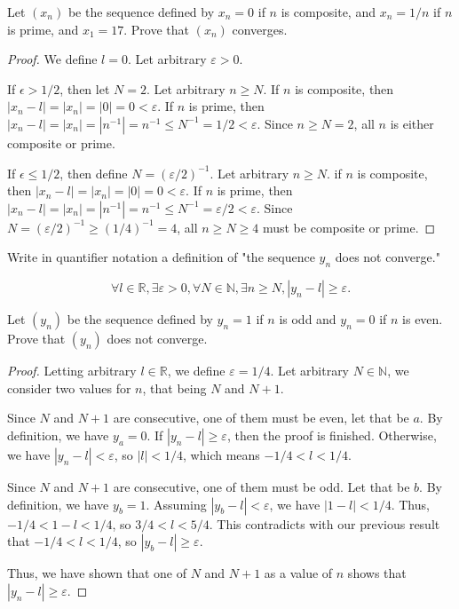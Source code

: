 \documentclass[11pt]{article}
\begin{document}
\begin{subquestion}
    Let $(x_n)$ be the sequence defined by $x_n = 0$ if $n$ is composite,
    and $x_n = 1/n$ if $n$ is prime, and $x_1 = 17$.
    Prove that $(x_n)$ converges.
\end{subquestion}
\begin{proof}
    We define $l = 0$. Let arbitrary $\varepsilon > 0$.

    If $\epsilon > 1/2$, then let $N = 2$.
    Let arbitrary $n \ge N$.
    If $n$ is composite, then $|x_n - l| = |x_n| = |0| = 0 < \varepsilon$.
    If $n$ is prime, then $|x_n - l| = |x_n| = |n^{-1}| = n^{-1} \le N^{-1} = 1/2 < \varepsilon$.
    Since $n \ge N = 2$, all $n$ is either composite or prime.
    
    If $\epsilon \le 1/2$, then define $N=(\varepsilon/2)^{-1}$.
    Let arbitrary $n \ge N$.
    if $n$ is composite, then $|x_n - l| = |x_n| = |0| = 0 < \varepsilon$.
    If $n$ is prime, then $|x_n - l| = |x_n| = |n^{-1}| = n^{-1} \le N^{-1} = \varepsilon/2 < \varepsilon$.
    Since $N = (\varepsilon/2)^{-1} \ge (1/4)^{-1} = 4$, all
    $n \ge N \ge 4$ must be composite or prime.
\end{proof}

\begin{subquestion}
    Write in quantifier notation a definition of
    "the sequence $y_n$ does not converge."
\end{subquestion}
\[
\forall l \in \mathbb{R}, \exists \varepsilon > 0, \forall N \in \mathbb{N}, \exists n \ge N, |y_n - l| \ge \varepsilon.
\]

\begin{subquestion}
    Let $(y_n)$ be the sequence defined by $y_n = 1$ if $n$ is odd and
    $y_n = 0$ if $n$ is even. Prove that $(y_n)$ does not converge.
\end{subquestion}

\begin{proof}
    Letting arbitrary $l \in \mathbb{R}$, we define $\varepsilon = 1/4$.
    Let arbitrary $N \in \mathbb{N}$, 
    we consider two values for $n$, that being $N$ and $N+1$.

    Since $N$ and $N+1$ are consecutive, one of them must be even, let that be $a$.
    By definition, we have $y_a = 0$.
    If $|y_n - l| \ge \varepsilon$, then the proof is finished.
    Otherwise, we have $|y_n - l| < \varepsilon$, so $|l| < 1/4$, 
    which means $-1/4 < l < 1/4$.

    Since $N$ and $N+1$ are consecutive, one of them must be odd. Let that be $b$.
    By definition, we have $y_b = 1$.
    Assuming $|y_b - l| < \varepsilon$, we have $|1 - l| < 1/4$.
    Thus, $-1/4 < 1 - l < 1/4$, so $3/4 < l < 5/4$.
    This contradicts with our previous result that $-1/4 < l < 1/4$,
    so $|y_b - l| \ge \varepsilon$.

    Thus, we have shown that one of $N$ and $N+1$ as a value of $n$
    shows that $|y_n -l| \ge \varepsilon$.
\end{proof}
\end{document}
